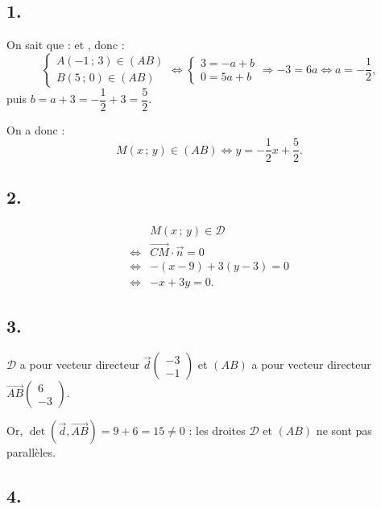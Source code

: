 \subsection*{1.}

On sait que :  et , donc :
\[
\begin{cases}
A(-1\,;\,3) \in (AB) \\
B(5\,;\,0) \in (AB)
\end{cases}
\iff
\begin{cases}
3 = -a + b \\
0 = 5a + b
\end{cases}
\Rightarrow -3 = 6a \iff a = -\dfrac{1}{2},
\]
puis \( b = a + 3 = -\dfrac{1}{2} + 3 = \dfrac{5}{2} \).

On a donc :
\[
M(x\,;\,y) \in (AB) \iff y = -\dfrac{1}{2}x + \dfrac{5}{2}.
\]

\subsection*{2.}

\begin{align*}
&M(x\,;\,y) \in \mathcal{D} \\
\iff &\overrightarrow{CM} \cdot \vec{n} = 0 \\
\iff &- (x - 9) + 3(y - 3) = 0 \\
\iff& -x + 3y = 0.
\end{align*}

\subsection*{3.}

\( \mathcal{D} \) a pour vecteur directeur \( \vec{d} \begin{pmatrix} -3 \\ -1 \end{pmatrix} \) et \( (AB) \) a pour vecteur directeur \( \overrightarrow{AB} \begin{pmatrix} 6 \\ -3 \end{pmatrix} \).

Or, \( \det\left(\vec{d}, \overrightarrow{AB}\right) = 9 + 6 = 15 \neq 0 \) : les droites \( \mathcal{D} \) et \( (AB) \) ne sont pas parallèles.

\subsection*{4.}

